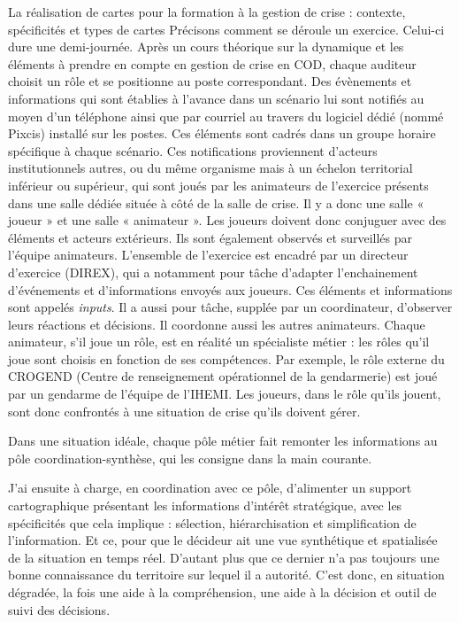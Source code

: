 \documentclass[10pt,a4paper]{report} %
\begin{document}
\begin{part}{La réalisation de cartes pour la formation à la gestion de crise : contexte, spécificités et types de cartes}
Précisons comment se déroule un exercice. Celui-ci dure une demi-journée. Après un cours théorique sur la dynamique et les éléments à prendre en compte en gestion de crise en COD, chaque auditeur choisit un rôle et se positionne au poste correspondant. Des évènements et informations qui sont établies à l’avance dans un scénario lui sont notifiés au moyen d’un téléphone ainsi que par courriel au travers du logiciel dédié (nommé Pixcis) installé sur les postes. Ces éléments sont cadrés dans un groupe horaire spécifique à chaque scénario. Ces notifications proviennent d’acteurs institutionnels autres, ou du même organisme mais à un échelon territorial inférieur ou supérieur, qui sont joués par les animateurs de l’exercice présents dans une salle dédiée située à côté de la salle de crise. Il y a donc une salle « joueur » et une salle « animateur ». Les joueurs doivent donc conjuguer avec des éléments et acteurs extérieurs. Ils sont également observés et surveillés par l’équipe animateurs. L’ensemble de l’exercice est encadré par un directeur d’exercice (DIREX), qui a notamment pour tâche d’adapter l’enchainement d’événements et d’informations envoyés aux joueurs. Ces éléments et informations sont appelés \textit{inputs}. Il a aussi pour tâche, supplée par un coordinateur, d’observer leurs réactions et décisions. Il coordonne aussi les autres animateurs. Chaque animateur, s’il joue un rôle, est en réalité un spécialiste métier : les rôles qu’il joue sont choisis en fonction de ses compétences. Par exemple, le rôle externe du CROGEND (Centre de renseignement opérationnel de la gendarmerie) est joué par un gendarme de l’équipe de l’IHEMI. Les joueurs, dans le rôle qu’ils jouent, sont donc confrontés à une situation de crise qu’ils doivent gérer. 

Dans une situation idéale, chaque pôle métier fait remonter les informations au pôle coordination-synthèse, qui les consigne dans la main courante. 

J’ai ensuite à charge, en coordination avec ce pôle, d’alimenter un support cartographique présentant les informations d’intérêt stratégique, avec les spécificités que cela implique : sélection, hiérarchisation et simplification de l’information. Et ce, pour que le décideur ait une vue synthétique et spatialisée de la situation en temps réel. D’autant plus que ce dernier n’a pas toujours une bonne connaissance du territoire sur lequel il a autorité. C’est donc, en situation dégradée, la fois une aide à la compréhension, une aide à la décision et outil de suivi des décisions.


\end{part}
\end{document}
